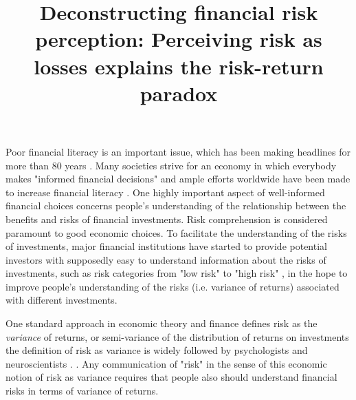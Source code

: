 \documentclass[a4paper,man, natbib,floatsintext]{apa6} %
\title{Deconstructing financial risk perception: Perceiving risk as losses explains the risk-return paradox}
\affiliation{University of Basel}
\begin{document}
\maketitle
%
%
Poor financial literacy is an important issue, which has been making headlines for more than 80 years \citep{carrns2019,nyt1939}. Many societies strive for an economy in which everybody makes "informed financial decisions" \citep[][p. 6]{FinancialLitear2011} and ample efforts worldwide have been made to increase financial literacy \citep{OECD2019}. One highly important aspect of well-informed financial choices concerns people's understanding of the relationship between the benefits and risks of financial investments. Risk comprehension is considered paramount to good economic choices. To facilitate the understanding of the risks of investments, major financial institutions have started to provide potential investors with supposedly easy to understand information about the risks of investments, such as risk categories from "low risk" to "high risk" \citep[e.g., ][]{postfinance2019}, in the hope to improve people's understanding of the risks (i.e. variance of returns) associated with different investments.

One standard approach in economic theory and finance defines risk as the \textit{variance} of returns, or semi-variance of the distribution of returns on investments  the definition of risk as variance is widely followed by psychologists and neuroscientists \citep[e.g.,][]{Nosic2010, Coombs1960, Mishra2016,Rushworth2008, Preuschoff2006, Fujimoto2016}. .  Any communication of "risk" in the sense of this economic notion of risk as variance requires that people also should understand financial risks in terms of variance of returns.
\end{document}
